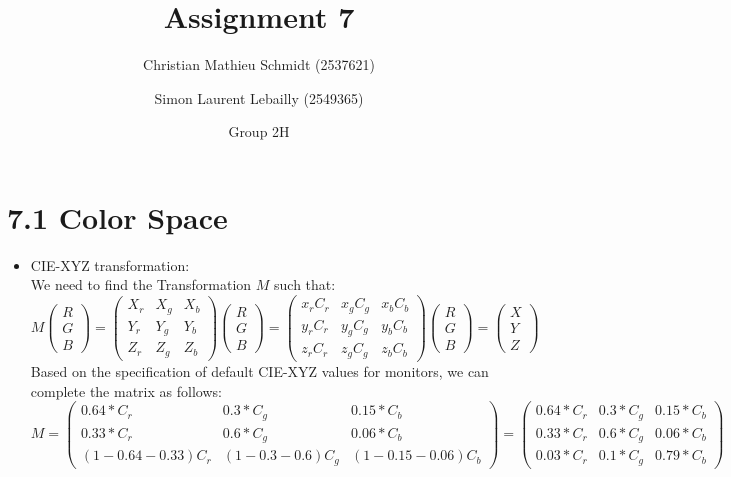 \documentclass{article}
\title{Assignment 7}
\author{Christian Mathieu Schmidt (2537621)
\and Simon Laurent Lebailly (2549365)\\
\and Group 2H}
\begin{document}
\maketitle


\section*{7.1 Color Space} \label{ex1}
    \begin{itemize}
        \item CIE-XYZ transformation:\\
        We need to find the Transformation $M$ such that:
        $$M \left(\begin{matrix} R\\G\\B \end{matrix}\right)  = \left( \begin{matrix} X_r & X_g & X_b \\ Y_r & Y_g & Y_b \\ Z_r & Z_g & Z_b \end{matrix} \right)\left(\begin{matrix} R\\G\\B \end{matrix}\right) = \left( \begin{matrix} x_rC_r & x_gC_g & x_bC_b \\ y_rC_r & y_gC_g & y_bC_b \\ z_rC_r & z_gC_g & z_bC_b \end{matrix} \right)\left(\begin{matrix} R\\G\\B \end{matrix}\right) = \left(\begin{matrix} X\\Y\\Z \end{matrix}\right)$$
        Based on the specification of default CIE-XYZ values for monitors, we can complete the matrix as follows:
        $$M  = \left( \begin{matrix} 0.64 * C_r & 0.3 * C_g & 0.15 * C_b \\ 0.33 * C_r & 0.6 * C_g & 0.06 * C_b \\ (1-0.64-0.33)C_r & (1-0.3-0.6)C_g & (1-0.15-0.06)C_b \end{matrix} \right) = \left( \begin{matrix} 0.64 * C_r & 0.3 * C_g & 0.15 * C_b \\ 0.33 * C_r & 0.6 * C_g & 0.06 * C_b \\ 0.03 * C_r & 0.1 * C_g & 0.79 * C_b \end{matrix} \right)$$

\end{itemize}
\end{document}

